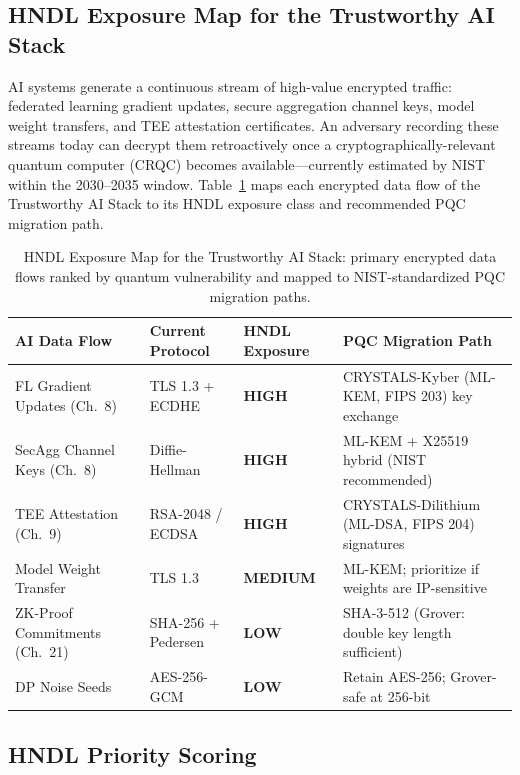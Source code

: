 \subsection{HNDL Exposure Map for the Trustworthy AI Stack}
\label{sec:hndl_exposure_map}

AI systems generate a continuous stream of high-value encrypted traffic: federated learning gradient updates, secure aggregation channel keys, model weight transfers, and TEE attestation certificates. An adversary recording these streams today can decrypt them retroactively once a cryptographically-relevant quantum computer (CRQC) becomes available---currently estimated by NIST within the 2030--2035 window. Table~\ref{tab:hndl_exposure} maps each encrypted data flow of the Trustworthy AI Stack to its HNDL exposure class and recommended PQC migration path.

\begin{table}[ht]
\centering
\caption{HNDL Exposure Map for the Trustworthy AI Stack: primary encrypted data flows ranked by quantum vulnerability and mapped to NIST-standardized PQC migration paths.}
\label{tab:hndl_exposure}
\renewcommand{\arraystretch}{1.4}
\begin{tabular}{p{3.2cm} p{2.3cm} p{2.0cm} p{4.2cm}}
\toprule
\textbf{AI Data Flow} & \textbf{Current Protocol} & \textbf{HNDL Exposure} & \textbf{PQC Migration Path} \\
\midrule
FL Gradient Updates (Ch.~8) & TLS 1.3 + ECDHE & \textbf{HIGH} & CRYSTALS-Kyber (ML-KEM, FIPS 203) key exchange \\
SecAgg Channel Keys (Ch.~8) & Diffie-Hellman & \textbf{HIGH} & ML-KEM + X25519 hybrid (NIST recommended) \\
TEE Attestation (Ch.~9) & RSA-2048 / ECDSA & \textbf{HIGH} & CRYSTALS-Dilithium (ML-DSA, FIPS 204) signatures \\
Model Weight Transfer & TLS 1.3 & \textbf{MEDIUM} & ML-KEM; prioritize if weights are IP-sensitive \\
ZK-Proof Commitments (Ch.~21) & SHA-256 + Pedersen & \textbf{LOW} & SHA-3-512 (Grover: double key length sufficient) \\
DP Noise Seeds & AES-256-GCM & \textbf{LOW} & Retain AES-256; Grover-safe at 256-bit \\
\bottomrule
\end{tabular}
\end{table}

\subsection{HNDL Priority Scoring}
\label{sec:hndl_scoring}

